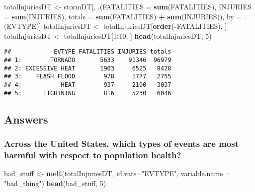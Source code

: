 \documentclass[]{article}
\newenvironment{Shaded}{\begin{snugshade}}{\end{snugshade}}
\newcommand{\KeywordTok}[1]{\textcolor[rgb]{0.13,0.29,0.53}{\textbf{#1}}}
\newcommand{\DataTypeTok}[1]{\textcolor[rgb]{0.13,0.29,0.53}{#1}}
\newcommand{\DecValTok}[1]{\textcolor[rgb]{0.00,0.00,0.81}{#1}}
\newcommand{\StringTok}[1]{\textcolor[rgb]{0.31,0.60,0.02}{#1}}
\newcommand{\OperatorTok}[1]{\textcolor[rgb]{0.81,0.36,0.00}{\textbf{#1}}}
\newcommand{\NormalTok}[1]{#1}
\begin{document}
\begin{Shaded}
\begin{Highlighting}[]
\NormalTok{totalInjuriesDT <-}\StringTok{ }\NormalTok{stormDT[, .(}\DataTypeTok{FATALITIES =} \KeywordTok{sum}\NormalTok{(FATALITIES), }\DataTypeTok{INJURIES =} \KeywordTok{sum}\NormalTok{(INJURIES), }\DataTypeTok{totals =} \KeywordTok{sum}\NormalTok{(FATALITIES) }\OperatorTok{+}\StringTok{ }\KeywordTok{sum}\NormalTok{(INJURIES)), by =}\StringTok{ }\NormalTok{.(EVTYPE)]}
\NormalTok{totalInjuriesDT <-}\StringTok{ }\NormalTok{totalInjuriesDT[}\KeywordTok{order}\NormalTok{(}\OperatorTok{-}\NormalTok{FATALITIES), ]}
\NormalTok{totalInjuriesDT <-}\StringTok{ }\NormalTok{totalInjuriesDT[}\DecValTok{1}\OperatorTok{:}\DecValTok{10}\NormalTok{, ]}
\KeywordTok{head}\NormalTok{(totalInjuriesDT, }\DecValTok{5}\NormalTok{)}
\end{Highlighting}
\end{Shaded}

\begin{verbatim}
##            EVTYPE FATALITIES INJURIES totals
## 1:        TORNADO       5633    91346  96979
## 2: EXCESSIVE HEAT       1903     6525   8428
## 3:    FLASH FLOOD        978     1777   2755
## 4:           HEAT        937     2100   3037
## 5:      LIGHTNING        816     5230   6046
\end{verbatim}

\subsection{Answers}\label{answers}

\subsubsection{Across the United States, which types of events are most
harmful with respect to population
health?}\label{across-the-united-states-which-types-of-events-are-most-harmful-with-respect-to-population-health}

\begin{Shaded}
\begin{Highlighting}[]
\NormalTok{bad_stuff <-}\StringTok{ }\KeywordTok{melt}\NormalTok{(totalInjuriesDT, }\DataTypeTok{id.vars=}\StringTok{"EVTYPE"}\NormalTok{, }\DataTypeTok{variable.name =} \StringTok{"bad_thing"}\NormalTok{)}
\KeywordTok{head}\NormalTok{(bad_stuff, }\DecValTok{5}\NormalTok{)}
\end{Highlighting}
\end{Shaded}
\end{document}
